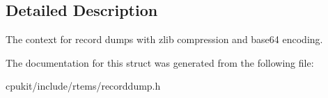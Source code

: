 \subsection{Detailed Description}
The context for record dumps with zlib compression and base64 encoding. 

The documentation for this struct was generated from the following file\+:\begin{DoxyCompactItemize}
\item 
cpukit/include/rtems/recorddump.\+h\end{DoxyCompactItemize}
